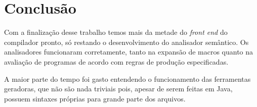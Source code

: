 \section{Conclusão}

Com a finalização desse trabalho temos mais da metade do \textit{front end} do compilador pronto, só restando o desenvolvimento do analisador semântico. Os analisadores funcionaram corretamente, tanto na expansão de macros quanto na avaliação de programas de acordo com regras de produção especificadas.

A maior parte do tempo foi gasto entendendo o funcionamento das ferramentas geradoras, que não são nada triviais pois, apesar de serem feitas em Java, possuem sintaxes próprias para grande parte dos arquivos. 